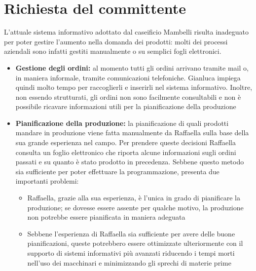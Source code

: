 \section{Richiesta del committente}\label{sec:richiesta-del-committente}
L'attuale sistema informativo adottato dal caseificio Mambelli risulta inadeguato per poter gestire l'aumento nella domanda dei prodotti: molti dei processi aziendali sono infatti gestiti manualmente o su semplici fogli elettronici.
\begin{itemize}
  \item \textbf{Gestione degli ordini:} al momento tutti gli ordini arrivano tramite mail o, in maniera informale, tramite comunicazioni telefoniche. Gianluca impiega quindi molto tempo per raccoglierli e inserirli nel sistema informativo. Inoltre, non essendo strutturati, gli ordini non sono facilmente consultabili e non è possibile ricavare informazioni utili per la pianificazione della produzione
  \item \textbf{Pianificazione della produzione:} la pianificazione di quali prodotti mandare in produzione viene fatta manualmente da Raffaella sulla base della sua grande esperienza nel campo. Per prendere queste decisioni Raffaella consulta un foglio elettronico che riporta alcune informazioni sugli ordini passati e su quanto è stato prodotto in precedenza. Sebbene questo metodo sia sufficiente per poter effettuare la programmazione, presenta due importanti problemi:
  \begin{itemize}
    \item Raffaella, grazie alla sua esperienza, è l'unica in grado di pianificare la produzione; se dovesse essere assente per qualche motivo, la produzione non potrebbe essere pianificata in maniera adeguata
    \item Sebbene l'esperienza di Raffaella sia sufficiente per avere delle buone pianificazioni, queste potrebbero essere ottimizzate ulteriormente con il supporto di sistemi informativi più avanzati riducendo i tempi morti nell'uso dei macchinari e minimizzando gli sprechi di materie prime
  \end{itemize}
\end{itemize}

